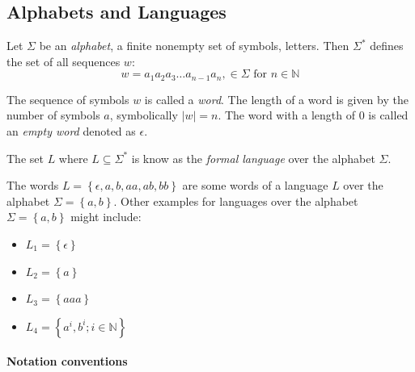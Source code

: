 \subsection{Alphabets and Languages}


\begin{definition}[Alphabet]
\label{def:alphabet}
Let $\Sigma$ be an \emph{alphabet}, a finite nonempty set of symbols, letters. Then $\Sigma ^{*}$ defines the set of all sequences $w$:
$$w= a_1 a_2 a_3 \dots a_{n-1} a_n, \in \Sigma \text{ for } n \in \mathbb{N}$$
\end{definition}

The sequence of symbols $w$ is called a \emph{word}. The length of a word is given by the number of symbols $a$, symbolically $|w| = n$. The word with a length of 0 is called an \emph{empty word} denoted as $\epsilon$.

\begin{definition}[Language]
\label{def:language}
The set $L$ where $L\subseteq \Sigma^{*}$ is know as the \emph{formal language} over the alphabet $\Sigma$. 
\end{definition}
The words $L = \left\lbrace \epsilon, a, b, aa, ab, bb \right\rbrace$ are some words of a language $L$ over the alphabet $\Sigma=\left\lbrace a,b \right\rbrace$.
Other examples for languages over the alphabet $\Sigma=\left\lbrace a,b \right\rbrace$ might include:
\begin{itemize}
\item $L_1 = \left\lbrace \epsilon \right\rbrace$
\item $L_2 = \left\lbrace a \right\rbrace$
\item $L_3 = \left\lbrace aaa \right\rbrace$
\item $L_4 = \left\lbrace a^i,b^i; i \in \mathbb{N} \right\rbrace$
\end{itemize}




\paragraph*{Notation conventions}



